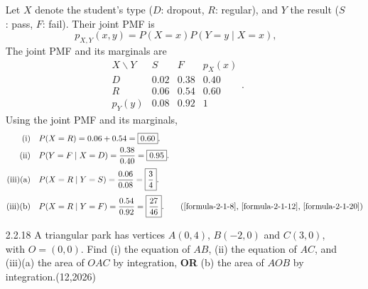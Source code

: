 \begin{enumerate}[label={},font=\normalfont,leftmargin=1.15cm,labelwidth=1.0cm,labelsep=0.15cm,itemindent=0pt,listparindent=0pt,itemsep=\baselineskip,parsep=0pt,topsep=0pt]
Let $X$ denote the student's type ($D$: dropout, $R$: regular), and $Y$ the result ($S$: pass, $F$: fail). Their joint PMF is
\[
p_{X,Y}(x,y)=P(X=x)P(Y=y\mid X=x),
\]
The joint PMF and its marginals are
\[
\begin{array}{c|cc|c}
X\backslash Y & S & F & p_X(x)\\\hline
D & 0.02 & 0.38 & 0.40\\
R & 0.06 & 0.54 & 0.60\\\hline
p_Y(y) & 0.08 & 0.92 & 1
\end{array}.
\]
Using the joint PMF and its marginals,
\begin{align*}
\text{(i)}\quad&P(X=R)=0.06+0.54=\boxed{0.60}.\\
\text{(ii)}\quad&P(Y=F\mid X=D)=\frac{0.38}{0.40}=\boxed{0.95}.\\[2pt]
\text{(iii)(a)}\quad&P(X=R\mid Y=S)=\frac{0.06}{0.08}=\boxed{\frac34}.\\[2pt]
\text{(iii)(b)}\quad&P(X=R\mid Y=F)=\frac{0.54}{0.92}=\boxed{\frac{27}{46}}.
\tag*{(\ref{formula-2-1-8}, \ref{formula-2-1-12}, \ref{formula-2-1-20})}\end{align*}

\item[2.2.18] A triangular park has vertices $A(0,4)$, $B(-2,0)$ and $C(3,0)$, with $O=(0,0)$. Find (i) the equation of $AB$, (ii) the equation of $AC$, and (iii)(a) the area of $OAC$ by integration, \textbf{OR} (b) the area of $AOB$ by integration.\nobreak\hfill\mbox{(12,2026)}



\vspace{0.6em}\par\solution



\end{enumerate}
